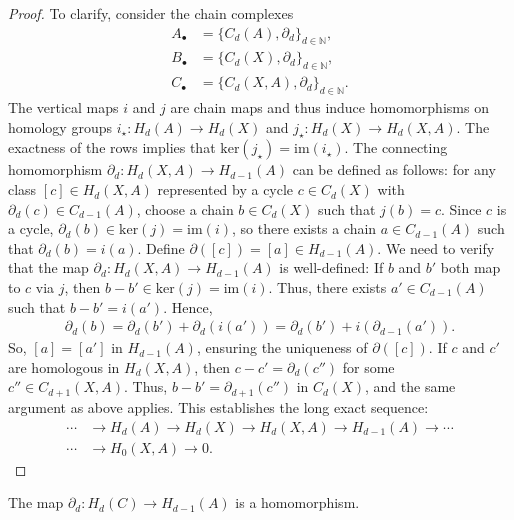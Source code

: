 \begin{proof}
	To clarify, consider the chain complexes
	\begin{align}
		A_{\bullet} & = \{C_{d}(A), \partial_{d}\}_{d \in \mathbb{N}},    \\
		B_{\bullet} & = \{C_{d}(X), \partial_{d}\}_{d \in \mathbb{N}},    \\
		C_{\bullet} & = \{C_{d}(X, A), \partial_{d}\}_{d \in \mathbb{N}}. 
	\end{align}
	The vertical maps \(i\) and \(j\) are chain maps and thus induce homomorphisms on homology groups \(i_{\star}: H_{d}(A) \rightarrow H_{d}(X)\) and \(j_{\star}: H_{d}(X) \rightarrow H_{d}(X, A)\). The exactness of the rows implies that \(\mathrm{ker}(j_{\star}) = \mathrm{im}(i_{\star})\). The connecting homomorphism \(\partial_d: H_{d}(X, A) \rightarrow H_{d-1}(A)\) can be defined as follows: for any class \([c] \in H_{d}(X, A)\) represented by a cycle \(c \in C_{d}(X)\) with \(\partial_{d}(c) \in C_{d-1}(A)\), choose a chain \(b \in C_{d}(X)\) such that \(j(b) = c\). Since \(c\) is a cycle, \(\partial_{d}(b) \in \mathrm{ker}(j) = \mathrm{im}(i)\), so there exists a chain \(a \in C_{d-1}(A)\) such that \(\partial_{d}(b) = i(a)\). Define \(\partial([c]) = [a] \in H_{d-1}(A)\). We need to verify that the map \(\partial_d: H_{d}(X, A) \rightarrow H_{d-1}(A)\) is well-defined: If \(b\) and \(b'\) both map to \(c\) via \(j\), then \(b - b' \in \mathrm{ker}(j) = \mathrm{im}(i)\). Thus, there exists \(a' \in C_{d-1}(A)\) such that \(b - b' = i(a')\). Hence,
	\begin{align}
		\partial_{d}(b) = \partial_{d}(b') + \partial_{d}(i(a')) = \partial_{d}(b') + i(\partial_{d-1}(a')). 
	\end{align}
	So, \([a] = [a']\) in \(H_{d-1}(A)\), ensuring the uniqueness of \(\partial([c])\). If \(c\) and \(c'\) are homologous in \(H_{d}(X, A)\), then \(c - c' = \partial_{d}(c'')\) for some \(c'' \in C_{d+1}(X, A)\). Thus, \(b - b' = \partial_{d+1}(c'')\) in \(C_{d}(X)\), and the same argument as above applies. This establishes the long exact sequence:
	\begin{align}
		\cdots &\rightarrow H_{d}(A) \rightarrow H_{d}(X) \rightarrow H_{d}(X, A) \rightarrow H_{d-1}(A) \rightarrow \cdots \\
		\cdots &\rightarrow H_{0}(X, A) \rightarrow 0.                                                                      
	\end{align}
\end{proof}

\begin{proposition}
	The map \(\partial_{d}: H_{d}(C) \rightarrow H_{d-1}(A)\) is a homomorphism.
\end{proposition}

